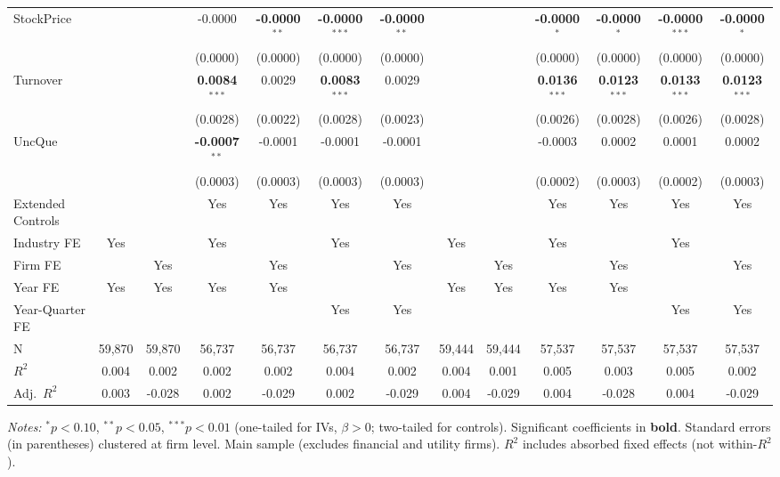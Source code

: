 \documentclass[11pt,a4paper]{article}
\begin{document}
\begin{table}[htbp]
\begin{tabular}{lcccccccccccc}
StockPrice &  &  & -0.0000 & \textbf{-0.0000}$^{**}$ & \textbf{-0.0000}$^{***}$ & \textbf{-0.0000}$^{**}$ &  &  & \textbf{-0.0000}$^{*}$ & \textbf{-0.0000}$^{*}$ & \textbf{-0.0000}$^{***}$ & \textbf{-0.0000}$^{*}$ \\
 &  &  & (0.0000) & (0.0000) & (0.0000) & (0.0000) &  &  & (0.0000) & (0.0000) & (0.0000) & (0.0000) \\
Turnover &  &  & \textbf{0.0084}$^{***}$ & 0.0029 & \textbf{0.0083}$^{***}$ & 0.0029 &  &  & \textbf{0.0136}$^{***}$ & \textbf{0.0123}$^{***}$ & \textbf{0.0133}$^{***}$ & \textbf{0.0123}$^{***}$ \\
 &  &  & (0.0028) & (0.0022) & (0.0028) & (0.0023) &  &  & (0.0026) & (0.0028) & (0.0026) & (0.0028) \\
UncQue &  &  & \textbf{-0.0007}$^{**}$ & -0.0001 & -0.0001 & -0.0001 &  &  & -0.0003 & 0.0002 & 0.0001 & 0.0002 \\
 &  &  & (0.0003) & (0.0003) & (0.0003) & (0.0003) &  &  & (0.0002) & (0.0003) & (0.0002) & (0.0003) \\
\midrule
Extended Controls &  &  & Yes & Yes & Yes & Yes &  &  & Yes & Yes & Yes & Yes \\
Industry FE & Yes &  & Yes &  & Yes &  & Yes &  & Yes &  & Yes &  \\
Firm FE &  & Yes &  & Yes &  & Yes &  & Yes &  & Yes &  & Yes \\
Year FE & Yes & Yes & Yes & Yes &  &  & Yes & Yes & Yes & Yes &  &  \\
Year-Quarter FE &  &  &  &  & Yes & Yes &  &  &  &  & Yes & Yes \\
\midrule
N & 59,870 & 59,870 & 56,737 & 56,737 & 56,737 & 56,737 & 59,444 & 59,444 & 57,537 & 57,537 & 57,537 & 57,537 \\
$R^2$ & 0.004 & 0.002 & 0.002 & 0.002 & 0.004 & 0.002 & 0.004 & 0.001 & 0.005 & 0.003 & 0.005 & 0.002 \\
Adj.~$R^2$ & 0.003 & -0.028 & 0.002 & -0.029 & 0.002 & -0.029 & 0.004 & -0.029 & 0.004 & -0.028 & 0.004 & -0.029 \\
\bottomrule
\end{tabular}
\begin{minipage}{\linewidth}
\vspace{2pt}\scriptsize
\textit{Notes:} $^{*}p<0.10$, $^{**}p<0.05$, $^{***}p<0.01$ (one-tailed for IVs, $\beta > 0$; two-tailed for controls).
 Significant coefficients in \textbf{bold}.
 Standard errors (in parentheses) clustered at firm level.
 Main sample (excludes financial and utility firms).
 $R^2$ includes absorbed fixed effects (not within-$R^2$).
\end{minipage}
\end{table}
\end{document}
